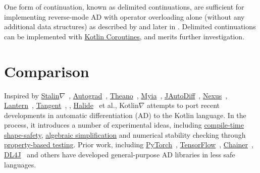 \documentclass[12pt,initial,twoside,maitrise]{dms}
\numberwithin{equation}{section}
\numberwithin{table}{chapter}
\numberwithin{figure}{chapter}
\begin{document}
One form of continuation, known as delimited continuations, are sufficient for implementing reverse-mode AD with operator overloading alone (without any additional data structures) as described by \citet{wang2018demystifying} and later in \citet{wang2018backpropagation}. Delimited continuations can be implemented with \href{https://kotlinlang.org/docs/reference/coroutines-overview.html}{Kotlin Coroutines}, and merits further investigation.

\section{Comparison}\label{sec:comparison}

Inspired by \href{https://github.com/Functional-AutoDiff/STALINGRAD}{Stalin$\nabla$}~\citep{pearlmutter2008using}, \href{https://github.com/HIPS/autograd/}{Autograd}~\citep{maclaurin2015autograd, maclaurin2016phd}, \href{http://deeplearning.net/software/theano/}{Theano}~\citep{bergstra2010theano}, \href{https://github.com/mila-iqia/myia}{Myia}~\citep{breuleux2017automatic, vanmerrienboer2018ad}, \href{https://github.com/uniker9/JAutoDiff/}{JAutoDiff}~\citep{nureki2012jautodiff}, \href{https://tongfei.me/nexus/}{Nexus}~\citep{chen2017typesafe}, \href{https://feiwang3311.github.io/Lantern/}{Lantern}~\citep{wang2018demystifying}, \href{https://github.com/google/tangent}{Tangent}~\citep{van2018tangent}, \citet{elliott2018simple}, \href{https://people.csail.mit.edu/tzumao/gradient_halide/}{Halide}~\citep{li2018halide} et al., Kotlin$\nabla$ attempts to port recent developments in automatic differentiation (AD) to the Kotlin language. In the process, it introduces a number of experimental ideas, including \hyperref[sec:shape-safety]{compile-time shape-safety}, \hyperref[sec:multiple-dispatch]{algebraic simplification} and numerical stability checking through \hyperref[sec:testing]{property-based testing}. Prior work, including \href{https://pytorch.org/}{PyTorch}~\citep{paszke2017automatic}, \href{https://www.tensorflow.org/}{TensorFlow}~\citep{abadi2016tensorflow}, \href{https://chainer.org/}{Chainer}~\citep{chainer}, \href{https://deeplearning4j.org/}{DL4J}~\cite{team2016dl4j} and others have developed general-purpose AD libraries in less safe languages.
\end{document}
